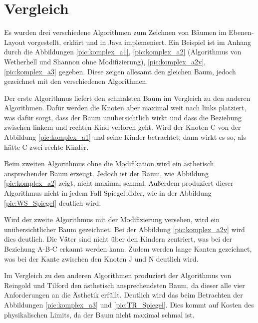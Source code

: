 \chapter{Vergleich}
\label{chap:kapitel4}
Es wurden drei verschiedene Algorithmen zum Zeichnen von Bäumen im Ebenen-Layout vorgestellt, erklärt und in Java implemeniert.
Ein Beispiel ist im Anhang durch die Abbildungen \ref{pic:komplex_a1}, \ref{pic:komplex_a2} (Algorithmus von Wetherhell und Shannon 
ohne Modifizierung), \ref{pic:komplex_a2v}, \ref{pic:komplex_a3} gegeben.
Diese zeigen allesamt den gleichen Baum, jedoch gezeichnet mit den verschiedenen Algorithmen. 

Der erste Algorithmus liefert den schmalsten Baum im Vergleich zu den anderen Algorithmen. Dafür werden die Knoten aber maximal weit nach links
platziert, was dafür sorgt, dass der Baum unübersichtlich wirkt und dass die Beziehung zwischen linkem und rechten Kind verloren geht. Wird der
Knoten C von der Abbildung \ref{pic:komplex_a1} und seine Kinder betrachtet, dann wirkt es so, als hätte C zwei rechte Kinder.

Beim zweiten Algorithmus ohne die Modifikation wird ein ästhetisch ansprechender Baum erzeugt. Jedoch ist der Baum, wie Abbildung
\ref{pic:komplex_a2} zeigt, nicht maximal schmal. Außerdem produziert dieser Algorithmus nicht in jedem Fall Spiegelbilder, wie in der
Abbildung \ref{pic:WS_Spiegel} deutlich wird. 

Wird der zweite Algorithmus mit der Modifizierung versehen, wird ein unübersichtlicher Baum gezeichnet. Bei der Abbildung \ref{pic:komplex_a2v}
wird dies deutlich. Die Väter sind nicht über den Kindern zentriert, was bei der Beziehung A-B-C erkannt werden kann. Zudem werden lange Kanten
gezeichnet, was bei der Kante zwischen den Knoten J und N deutlich wird.

Im Vergleich zu den anderen Algorithmen produziert der Algorithmus von Reingold und Tilford den ästhetisch ansprechendsten Baum, da dieser
alle vier Anforderungen an die Ästhetik erfüllt. Deutlich wird das beim Betrachten der Abbildungen \ref{pic:komplex_a3} und \ref{pic:TR_Spiegel}.
Dies kommt auf Kosten des physikalischen Limits, da der Baum nicht maximal schmal ist.

